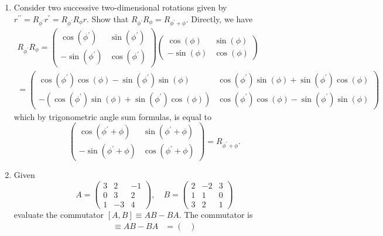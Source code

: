\documentclass[11pt]{article}
\newcommand{\dprime}{\prime\prime}
\begin{document}
\begin{enumerate}
    \item Consider two successive two-dimensional rotations given by $r^{\dprime} = R_{\phi^{\prime}}r^{\prime} = R_{\phi^{\prime}}R_{\phi}r$. Show that $R_{\phi^{\prime}}R_{\phi} = R_{\phi^{\prime}+\phi}$.
    Directly, we have \begin{multline*}
        R_{\phi^{\prime}}R_{\phi} =\begin{pmatrix}
            \cos(\phi^{\prime}) & \sin(\phi^{\prime})\\
            -\sin(\phi^{\prime}) & \cos(\phi^{\prime})
        \end{pmatrix}\begin{pmatrix}
            \cos(\phi) & \sin(\phi)\\
            -\sin(\phi) & \cos(\phi)
        \end{pmatrix} \\
        = \begin{pmatrix}
            \cos(\phi^{\prime})\cos(\phi) - \sin(\phi^{\prime})\sin(\phi) & \cos(\phi^{\prime})\sin(\phi) + \sin(\phi^{\prime})\cos(\phi)\\
            -(\cos(\phi^{\prime})\sin(\phi) + \sin(\phi^{\prime})\cos(\phi)) & \cos(\phi^{\prime})\cos(\phi) - \sin(\phi^{\prime})\sin(\phi)
        \end{pmatrix}
    \end{multline*} which by trigonometric angle sum formulas, is equal to \[\begin{pmatrix}
        \cos(\phi^{\prime}+\phi) & \sin(\phi^{\prime}+\phi)\\
        -\sin(\phi^{\prime}+\phi) & \cos(\phi^{\prime}+\phi)
    \end{pmatrix}= R_{\phi^{\prime}+\phi}.\]
    \item Given \[A = \begin{pmatrix}
        3 & 2 & -1 \\
        0 & 3 & 2 \\
        1 & -3 & 4
    \end{pmatrix}, \quad B = \begin{pmatrix}
        2 & -2 & 3 \\
        1 & 1 & 0 \\
        3 & 2 & 1
    \end{pmatrix}\]
    evaluate the commutator $[A,B]\equiv AB-BA$.
    The commutator is \begin{align*}
        [A,B]\equiv AB-BA &= \begin{pmatrix}

\end{pmatrix}
\end{align*}
\end{enumerate}
\end{document}
